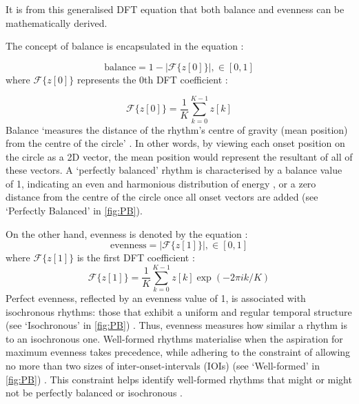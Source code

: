 \documentclass[12pt]{article}
\numberwithin{subsubsubsection}{subsubsection}
\begin{document}
It is from this generalised DFT equation that both balance and evenness can be mathematically derived.

The concept of balance is encapsulated in the equation \cite{Milne}:

\begin{equation}
\text{balance} = 1 - |\mathcal{F}\{z[0]\}|, \in [0, 1]
\end{equation}
where $\mathcal{F}\{z[0]\}$ represents the $0$th DFT coefficient \cite{Milne}:

\begin{equation}
\mathcal{F}\{z[0]\} = \frac{1}{K} \sum_{k=0}^{K-1}z[k] 
\end{equation}
Balance ‘measures the distance of the rhythm’s centre of gravity (mean position) from the centre of the circle’ \cite{Milne}. In other words, by viewing each onset position on the circle as a 2D vector, the mean position would represent the resultant of all of these vectors. A `perfectly balanced' rhythm is characterised by a balance value of 1, indicating an even and harmonious distribution of energy \cite{Milne}, or a zero distance from the centre of the circle once all onset vectors are added (see ‘Perfectly Balanced’ in \autoref{fig:PB}).

On the other hand, evenness is denoted by the equation \cite{Milne}:
\begin{equation}
\text{evenness} = |\mathcal{F}\{z[1]\}|, \in [0, 1]
\end{equation}
where $\mathcal{F}\{z[1]\}$ is the first DFT coefficient \cite{Milne}:
\begin{equation}
\mathcal{F}\{z[1]\} = \frac{1}{K} \sum_{k=0}^{K-1}z[k]  \exp\left(-2\pi ik/K\right)
\end{equation}
\newpage
Perfect evenness, reflected by an evenness value of 1, is associated with isochronous rhythms: those that exhibit a uniform and regular temporal structure (see ‘Isochronous’ in \autoref{fig:PB}) \cite{Toussaint1}. Thus, evenness measures how similar a rhythm is to an isochronous one. Well-formed rhythms materialise when the aspiration for maximum evenness takes precedence, while adhering to the constraint of allowing no more than two sizes of inter-onset-intervals (IOIs) (see ‘Well-formed’ in \autoref{fig:PB}) \cite{Milne}. This constraint helps identify well-formed rhythms that might or might not be perfectly balanced or isochronous \cite{Milne}.
\end{document}
